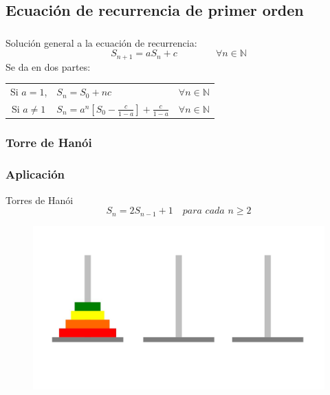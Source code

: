 \subsection{Ecuación de recurrencia de primer orden}

\begin{frame}
\frametitle{\subsecname}

\begin{block}{}
	Solución general a la ecuación de recurrencia: \[ S_{n+1} = aS_n + c \qquad \qquad \forall n \in \mathds{N} \]
	Se da en dos partes:
	\begin{tabular}{cll}
		Si $a=1$, & $S_n = S_0 + nc$ & $\forall n \in \mathds{N}$\\
		Si $a\neq 1$& $S_n = a^n [S_0 - \frac{c}{1-a}] + \frac{c}{1-a}$  &$\forall n \in \mathds{N} $
		\end{tabular}
	\end{block}
\end{frame}

\subsubsection{Torre de Hanói}

\begin{frame}
\frametitle{Aplicación}

\begin{block}{Torres de Hanói}
	$$S_{n}=2S_{n-1}+1\quad\textit{para cada $n \geq 2$}$$
\end{block}

\begin{block}{}
	\begin{figure}
		\centering
		\includegraphics[scale=0.15]{torre.jpg}
	\end{figure}
\end{block}
\end{frame}

